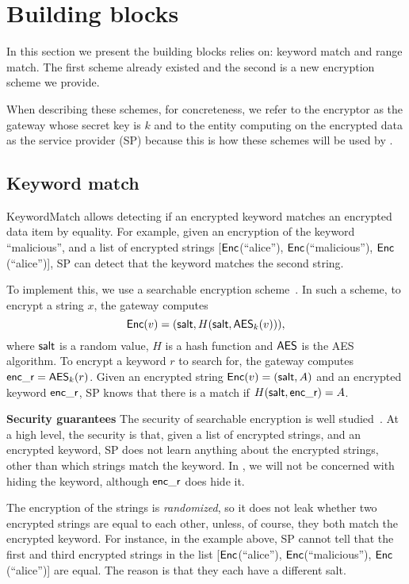 


\section{Building blocks}

In this section we present the building blocks \sys relies on: keyword match and range match. The first scheme already existed and the second is a new encryption scheme we provide. 

When describing these schemes, for concreteness, we refer to the encryptor as the gateway whose secret key is $k$ and to the entity computing on the encrypted data as the service provider (SP) because this is how these schemes will be used by \sys.


\subsection{Keyword match}\label{s:kwmatch}


KeywordMatch allows detecting if an encrypted keyword matches an encrypted data item by equality.
For example, given an encryption of the keyword ``malicious'', and a list of encrypted strings  [$\mathsf{Enc}$(``alice''), $\mathsf{Enc}$(``malicious''), $\mathsf{Enc}$(``alice'')], SP can  detect that the keyword matches the second string. 

To implement this, we use a searchable encryption scheme~\cite{song:search, blindbox}.
In such a scheme, 
to encrypt a string $x$, the gateway computes 
\begin{equation}
\mathsf{Enc}(v) = (\mathsf{salt}, H(\mathsf{salt}, \mathsf{AES}_k(v))), \label{eq:KWMatchEnc}
\end{equation}
where $\mathsf{salt}$ is a random value, $H$ is a hash function and $\mathsf{AES}$ is the AES algorithm.
To encrypt a keyword $r$ to search for, the gateway computes $\mathsf{enc\_r} = \mathsf{AES}_k(r)$. 
Given an encrypted string $\mathsf{Enc}(v) = (\mathsf{salt}, A)$ and an encrypted keyword $\mathsf{enc\_r}$, SP knows that there is a match if  $H(\mathsf{salt}, \mathsf{enc\_r}) = A$.  

\noindent\textbf{Security guarantees} The security of searchable encryption is well studied~\cite{song:search, blindbox}. At a high level, the security is that, given a list of encrypted strings, and an encrypted keyword, SP does not learn anything about the encrypted strings, other than which strings match the keyword. In \sys, we will not be concerned with hiding the keyword, although $\mathsf{enc\_r}$ does hide it. 

 The encryption of the strings is {\em randomized}, so it does not leak whether two encrypted strings are equal to each other, unless, of course, they both match the encrypted keyword. For instance, in the example above, SP cannot tell that the first and third encrypted strings 
in the list [$\mathsf{Enc}$(``alice''), $\mathsf{Enc}$(``malicious''), $\mathsf{Enc}$(``alice'')] are equal. The reason is that they each have a different salt.  

